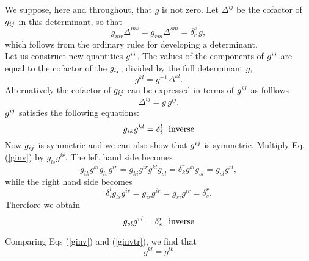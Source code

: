 
We suppose, here and throughout, that $g$ is not zero. Let $\Delta^{ij}$ be the cofactor of $g_{ij}$ in this determinant, so that 
$$g_{mr} \Delta^{ms} = g_{rm}\Delta^{sm} = \delta^s_r\, g,$$ which follows from the ordinary rules for developing a determinant. \\
 
Let us construct new quantities $g^{ij}$. 
The values of the components of $g^{ij}$ are equal to the cofactor of the $g_{ij}$, divided by the full determinant $g$,
\begin{equation} g^{kl} = g^{-1} \Delta^{kl}.  \label{ginveq} \end{equation} Alternatively the cofactor of $g_{ij}$ can be expressed in terms of $g^{ij}$ as folllows
\begin{equation} \Delta^{ij} = g\,g^{ij}\label{cofactor}. \end{equation}
$g^{ij}$ satisfies the following equations:
\begin{equation}
g_{ik}g^{kl}  = \delta^l_i \label{ginv}\hbox{~~inverse}
\end{equation}
Now $g_{ij}$ is symmetric and we can also show that $g^{ij}$ is symmetric. Multiply Eq. (\ref{ginv}) by $g_{ls}g^{ir}$. The left hand side becomes
\[ g_{ik}g^{kl} g_{ls}g^{ir} =g_{ki}g^{ir} g^{kl}g_{sl} = \delta^r_k g^{kl} g_{sl} = g_{sl}g^{rl}, \] while the right hand side becomes
\[ \delta^l_i g_{ls}g^{ir} = g_{is}g^{ir} = g_{si}g^{ir} = \delta^r_s.\] Therefore we obtain 
\begin{equation}
g_{sl}g^{rl} = \delta^r_s \hbox{~~inverse}\label{ginvtr}
\end{equation}

Comparing Eqs (\ref{ginv}) and (\ref{ginvtr}), we find that
\[ g^{kl} = g^{lk} \]

